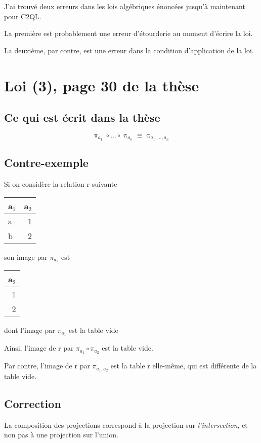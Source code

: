 \documentclass[french]{article}
\DeclareMathOperator{\proj}{\pi}
\begin{document}
J'ai trouvé deux erreurs dans les lois algébriques
énoncées jusqu'à maintenant pour C2QL.

La première est probablement une erreur d'étourderie
au moment d'écrire la loi.

La deuxième, par contre, est une erreur dans la condition
d'application de la loi.


\section*{Loi (3), page 30 de la thèse}
\subsection*{Ce qui est écrit dans la thèse}
$$ 
\proj_{a_1} \circ \dots \circ \proj_{a_n} 
\equiv \proj_{a_1, \dots, a_n}
$$

\subsection*{Contre-exemple}
Si on considère la relation r suivante
\begin{center}
	\begin{tabular}{lr}
		a\(_{\text{1}}\) & a\(_{\text{2}}\)\\
		\hline
		a & 1\\
		b & 2\\
	\end{tabular}
\end{center}
son image par \(\pi_{a_2}\) est
\begin{center}
	\begin{tabular}{r}
		a\(_{\text{2}}\)\\
		\hline
		1\\
		2\\
	\end{tabular}
\end{center}
dont l'image par \(\pi_{a_1}\) est la table vide

Ainsi, l'image de r par
\(\pi_{a_1} \circ \pi_{a_2}\) est la table vide.

Par contre, l'image de r par
\(\pi_{a_1, a_2}\)
est la table r elle-même,
qui est différente de la table vide.



\subsection*{Correction}
La composition des projections correspond à la projection sur \emph{l'intersection},
et non pas à une projection sur l'union.
\end{document}
